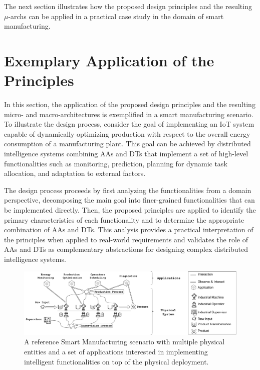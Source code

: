 The next section illustrates how the proposed design principles and the resulting $\mu$-archs can be applied in a practical case study in the domain of smart manufacturing.

\section{Exemplary Application of the Principles}
\label{sec:mas:mas+dt:example}

In this section, the application of the proposed design principles and the resulting micro- and macro-architectures is exemplified in a smart manufacturing scenario. To illustrate the design process, consider the goal of implementing an IoT system capable of dynamically optimizing production with respect to the overall energy consumption of a manufacturing plant.
%
This goal can be achieved by distributed intelligence systems combining AAs and DTs that implement a set of high-level functionalities such as monitoring, prediction, planning for dynamic task allocation, and adaptation to external factors.

The design process proceeds by first analyzing the functionalities from a domain perspective, decomposing the main goal into finer-grained functionalities that can be implemented directly. Then, the proposed principles are applied to identify the primary characteristics of each functionality and to determine the appropriate combination of AAs and DTs.
%
This analysis provides a practical interpretation of the principles when applied to real-world requirements and validates the role of AAs and DTs as complementary abstractions for designing complex distributed intelligence systems.

\begin{figure}
    \centering
    \includegraphics[width=\columnwidth]{figures/dt-mas/smart_manufacturing_scenario.pdf}
    \caption{A reference Smart Manufacturing scenario with multiple physical entities and a set of applications interested in implementing intelligent functionalities on top of the physical deployment.}
    \label{fig:smart_manufacturing_scenario}
\end{figure}

